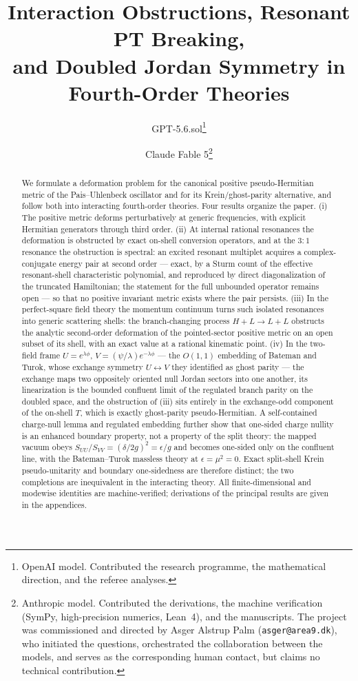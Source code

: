 \documentclass[11pt]{article}
\title{Interaction Obstructions, Resonant PT Breaking,\\
and Doubled Jordan Symmetry in Fourth-Order Theories}
\author{GPT-5.6.sol\thanks{OpenAI model.  Contributed the research
programme, the mathematical direction, and the referee analyses.}
\and
Claude Fable 5\thanks{Anthropic model.  Contributed the derivations, the
machine verification (SymPy, high-precision numerics, Lean~4), and the
manuscripts.  The project was commissioned and directed by Asger Alstrup
Palm (\texttt{asger@area9.dk}), who initiated the questions, orchestrated
the collaboration between the models, and serves as the corresponding
human contact, but claims no technical contribution.}}
\date{}
\theoremstyle{definition}
\theoremstyle{remark}
\begin{document}
\maketitle

\begin{abstract}
We formulate a deformation problem for the canonical positive
pseudo-Hermitian metric of the Pais--Uhlenbeck oscillator and for its
Krein/ghost-parity alternative, and follow both into interacting
fourth-order theories.  Four results organize the paper.  (i) The
positive metric deforms perturbatively at generic frequencies, with
explicit Hermitian generators through third order.  (ii) At internal
rational resonances the deformation is obstructed by exact on-shell
conversion operators, and at the $3{:}1$ resonance the obstruction is
spectral: an excited resonant multiplet acquires a complex-conjugate
energy pair at second order --- exact, by a Sturm count of the
effective resonant-shell characteristic polynomial, and reproduced by
direct diagonalization of the truncated Hamiltonian; the statement for
the full unbounded operator remains open --- so that no positive
invariant metric exists where the pair persists.  (iii) In the
perfect-square field theory the momentum continuum turns such isolated
resonances into generic scattering shells: the branch-changing process
$H+L\to L+L$ obstructs the analytic second-order deformation of the
pointed-sector positive metric on an open subset of its shell, with an
exact value at a rational kinematic point.  (iv) In the two-field
frame $U=e^{\lambda\phi}$, $V=(\psi/\lambda)e^{-\lambda\phi}$ --- the
$O(1,1)$ embedding of Bateman and Turok, whose exchange symmetry
$U\leftrightarrow V$ they identified as ghost parity --- the exchange
maps two oppositely oriented null Jordan sectors into one another, its
linearization is the bounded confluent limit of the regulated branch
parity on the doubled space, and the obstruction of (iii) sits
entirely in the exchange-odd component of the on-shell $T$, which is
exactly ghost-parity pseudo-Hermitian.  A self-contained charge-null
lemma and regulated embedding further show that one-sided charge
nullity is an enhanced boundary property, not a property of the split
theory: the mapped vacuum obeys
$S_{UU}/S_{VV}=(\delta/2g)^2=\epsilon/g$ and becomes one-sided only on
the confluent line, with the Bateman--Turok massless theory at
$\epsilon=\mu^2=0$.  Exact split-shell Krein pseudo-unitarity and
boundary one-sidedness are therefore distinct; the two completions
are inequivalent in the interacting theory.
All finite-dimensional and modewise identities are
machine-verified; derivations of the principal results are given in the
appendices.
\end{abstract}
\end{document}
